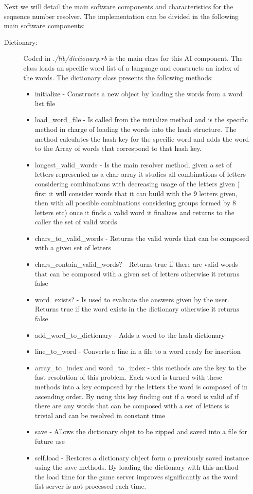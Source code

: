 \documentclass[a4paper,10pt,titlepage]{article}
\begin{document}
\par Next we will detail the main software components and characteristics for the sequence number resolver. The implementation can be divided in the following main software components:
\begin{description}
	\item[Dictionary:] Coded in \textit{./lib/dictionary.rb} is the main class for this AI component. The class loads an specific word list of a language and constructs an index of the words. The dictionary class presents the following methods:
	\begin{itemize}
		\item initialize - Constructs a new object by loading the words from a word list file
		\item load\_word\_file - Is called from the initialize method and is the specific method in charge of loading the words into the hash structure. The method calculates the hash key for the specific word and adds the word to the Array of words that correspond to that hash key. 
		\item longest\_valid\_words - Is the main resolver method, given a set of letters represented as a char array it studies all combinations of letters considering combinations with decreasing usage of the letters given ( first it will consider words that it can build with the 9 letters given, then with all possible combinations considering groups formed by 8 letters etc) once it finds a valid word it finalizes and returns to the caller the set of valid words
		\item chars\_to\_valid\_words - Returns the valid words that can be composed with a given set of letters
		\item chars\_contain\_valid\_words? - Returns true if there are valid words that can be composed with a given set of letters otherwise it returns false
		\item word\_exists? - Is used to evaluate the answers given by the user. Returns true if the word exists in the dictionary otherwise it returns false
		\item add\_word\_to\_dictionary - Adds a word to the hash dictionary
		\item line\_to\_word - Converts a line in a file to a word ready for insertion
		\item array\_to\_index and word\_to\_index - this methods are the key to the fast resolution of this problem. Each word is turned with these methods into a key composed by the letters the word is composed of in ascending order. By using this key finding out if a word is valid of if there are any words that can be composed with a set of letters is trivial and can be resolved in constant time
		\item save - Allows the dictionary objet to be zipped and saved into a file for future use
		\item self.load - Restores a dictionary object form a previously saved instance using the save methods. By loading the dictionary with this method the load time for the game server improves significantly as the word list server is not processed each time. 
	\end{itemize}
\end{description}	
		
\end{document}
